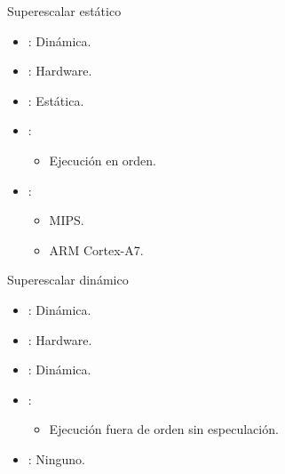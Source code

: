 \begin{frame}[t]{Superescalar estático}
\begin{itemize}
  \item {}: Dinámica.
  \item {}: Hardware.
  \item {}: Estática.
  \item {}:
    \begin{itemize}
      \item Ejecución en orden.
    \end{itemize}
  
  \item {}:
    \begin{itemize}
      \item MIPS.
      \item ARM Cortex-A7.
    \end{itemize}
\end{itemize}
\end{frame}

\begin{frame}[t]{Superescalar dinámico}
\begin{itemize}
  \item {}: Dinámica.
  \item {}: Hardware.
  \item {}: Dinámica.
  \item {}:
    \begin{itemize}
      \item Ejecución fuera de orden sin especulación.
    \end{itemize}
  
  \item {}: Ninguno.
\end{itemize}
\end{frame}

